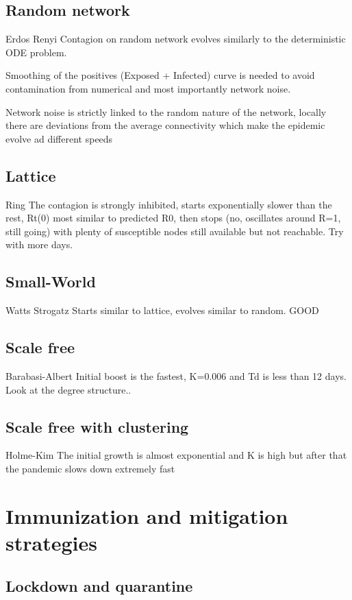 \documentclass[DIV=12, BCOR=0pt]{scrartcl}  %
\begin{document}
  \subsection{Random network}
  Erdos Renyi
  Contagion on random network evolves similarly to the deterministic ODE problem. 
  
  Smoothing of the positives (Exposed + Infected) curve is needed to avoid contamination from numerical and most importantly network noise. 
  
  Network noise is strictly linked to the random nature of the network, locally there are deviations from the average connectivity which make the epidemic evolve ad different speeds
  
  
  \subsection{Lattice}
  Ring
  The contagion is strongly inhibited, starts exponentially slower than the rest, Rt(0) most similar to predicted R0,
  then stops (no, oscillates around R=1, still going) with plenty of susceptible nodes still available but not reachable. Try with more days.
  
  
  \subsection{Small-World}
  Watts Strogatz
  Starts similar to lattice, evolves similar to random. GOOD
  
  \subsection{Scale free}
  Barabasi-Albert
  Initial boost is the fastest, K=0.006 and Td is less than 12 days. Look at the degree structure..
  
  
  \subsection{Scale free with clustering}
  Holme-Kim
  The initial growth is almost exponential and K is high but after that the pandemic slows down extremely fast
  
  
  
  
  
  
  \section{Immunization and mitigation strategies}
  \subsection{Lockdown and quarantine}
\end{document}

